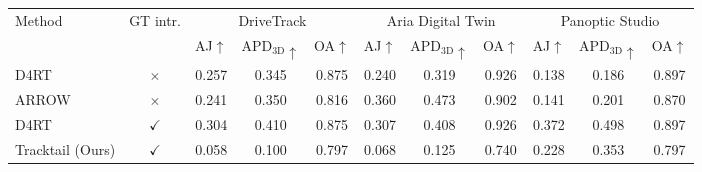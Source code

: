 \begin{tabular}{l c ccc ccc ccc}
\toprule
\multirow{2}{*}{Method}
  & \multirow{2}{*}{GT intr.}
  & \multicolumn{3}{c}{DriveTrack}
  & \multicolumn{3}{c}{Aria Digital Twin}
  & \multicolumn{3}{c}{Panoptic Studio} \\
\cmidrule(lr){3-5}\cmidrule(lr){6-8}\cmidrule(lr){9-11}
  &
  & AJ$\uparrow$ & APD$_\text{3D}\uparrow$ & OA$\uparrow$
  & AJ$\uparrow$ & APD$_\text{3D}\uparrow$ & OA$\uparrow$
  & AJ$\uparrow$ & APD$_\text{3D}\uparrow$ & OA$\uparrow$ \\
\midrule
D4RT~\cite{zhang2026d4rt}
  & $\times$
  & 0.257 & 0.345 & 0.875
  & 0.240 & 0.319 & 0.926
  & 0.138 & 0.186 & 0.897 \\
ARROW~\cite{fradlin2026arrow}
  & $\times$
  & 0.241 & 0.350 & 0.816
  & 0.360 & 0.473 & 0.902
  & 0.141 & 0.201 & 0.870 \\
\midrule
\rowcolor{rowgray}
D4RT~\cite{zhang2026d4rt}
  & $\checkmark$
  & 0.304 & 0.410 & 0.875
  & 0.307 & 0.408 & 0.926
  & 0.372 & 0.498 & 0.897 \\
Tracktail (Ours)
  & $\checkmark$
  & 0.058 & 0.100 & 0.797
  & 0.068 & 0.125 & 0.740
  & 0.228 & 0.353 & 0.797 \\
\bottomrule
\end{tabular}
